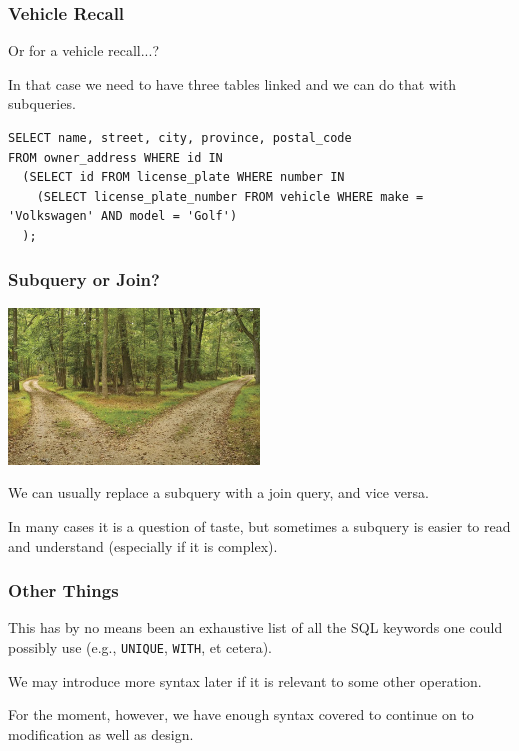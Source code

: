 \begin{frame}[fragile]
\frametitle{Vehicle Recall}
Or for a vehicle recall...?

In that case we need to have three tables linked and we can do that with subqueries.
{\scriptsize
\begin{verbatim}
SELECT name, street, city, province, postal_code 
FROM owner_address WHERE id IN 
  (SELECT id FROM license_plate WHERE number IN 
    (SELECT license_plate_number FROM vehicle WHERE make = 'Volkswagen' AND model = 'Golf')
  );
\end{verbatim}
}

\end{frame}



\begin{frame}
\frametitle{Subquery or Join?}

\begin{center}
	\includegraphics[width=0.5\textwidth]{images/forkroad.jpg}
\end{center}


We can usually replace a subquery with a join query, and vice versa.

 In many cases it is a question of taste, but sometimes a subquery is easier to read and understand (especially if it is complex). 


\end{frame}



\begin{frame}
\frametitle{Other Things}

This has by no means been an exhaustive list of all the SQL keywords one could possibly use (e.g., \texttt{UNIQUE}, \texttt{WITH}, et cetera). 

We may introduce more syntax later if it is relevant to some other operation. 

For the moment, however, we have enough syntax covered to continue on to modification as well as design. 


\end{frame}


